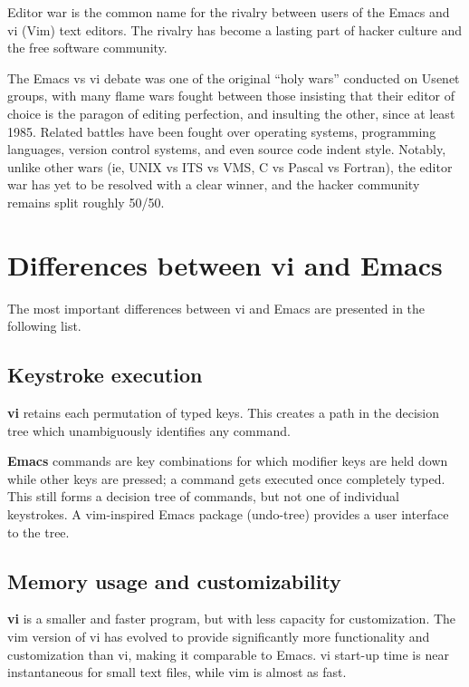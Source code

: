 \documentclass[10pt,twoside,openright]{memoir}
\begin{document}
Editor war is the common name for the rivalry between users of the Emacs and vi (Vim) text editors. The rivalry has become a lasting part of hacker culture and the free software community.

The Emacs vs vi debate was one of the original ``holy wars'' conducted on Usenet groups, with many flame wars fought between those insisting that their editor of choice is the paragon of editing perfection, and insulting the other, since at least 1985. Related battles have been fought over operating systems, programming languages, version control systems, and even source code indent style. Notably, unlike other wars (ie, UNIX vs ITS vs VMS, C vs Pascal vs Fortran), the editor war has yet to be resolved with a clear winner, and the hacker community remains split roughly 50/50.

\section{Differences between vi and Emacs}

The most important differences between vi and Emacs are presented in the following list.

\subsection{Keystroke execution}

\textbf{vi} retains each permutation of typed keys. This creates a path in the decision tree which unambiguously identifies any command.

\textbf{Emacs} commands are key combinations for which modifier keys are held down while other keys are pressed; a command gets executed once completely typed. This still forms a decision tree of commands, but not one of individual keystrokes. A vim-inspired Emacs package (undo-tree) provides a user interface to the tree.

\subsection{Memory usage and customizability}

\textbf{vi} is a smaller and faster program, but with less capacity for customization. The vim version of vi has evolved to provide significantly more functionality and customization than vi, making it comparable to Emacs. vi start-up time is near instantaneous for small text files, while vim is almost as fast.
\end{document}
